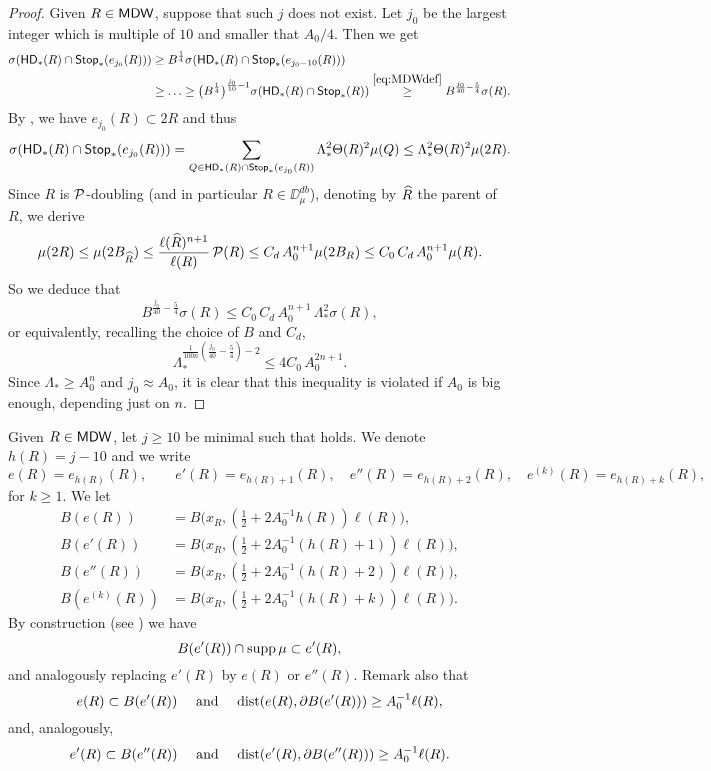 \begin{proof}
Given $R\in{\mathsf{MDW}}$, suppose that such $j$ does not exist. Let $j_0$ be the largest integer which is multiple of $10$ and smaller that $A_0/4$.
Then we get
\begin{align*}
\sigma({\mathsf{HD}}_*(R)\cap{\mathsf {Stop}}_*(e_{j_0}(R))) & \geq B^{\frac14}\sigma({\mathsf{HD}}_*(R)\cap{\mathsf {Stop}}_*(e_{j_0-10}(R)))\\
&\geq
\ldots \geq \big(B^{\frac14}\big)^{\frac{j_0}{10}-1}\sigma({\mathsf{HD}}_*(R)\cap{\mathsf {Stop}}_*(R)) \overset{\eqref{eq:MDWdef}}{\geq} B^{\frac{j_0}{40}-\frac54}\sigma(R).
\end{align*}
By , we have $e_{j_0}(R)\subset 2R$ and thus
$$\sigma({\mathsf{HD}}_*(R)\cap{\mathsf {Stop}}_*(e_{j_0}(R)))= \sum_{Q\in{\mathsf{HD}}_*(R)\cap {\mathsf {Stop}}_*(e_{j_0}(R))} \Lambda_*^2\Theta(R)^2\mu(Q)\leq 
\Lambda_*^2\Theta(R)^2\mu(2R).$$
Since $R$ is ${\mathcal P}$-doubling (and in particular $R\in\DD_\mu^{db}$), denoting by ${\widehat{R}}$ the parent of $R$,  we derive 
\begin{equation}\label{eqdoub*11}
\mu(2R)\leq \mu(2B_{{\widehat{R}}}) \leq \frac{\ell({\widehat{R}})^{n+1}}{\ell(R)}\,{\mathcal P}(R) \leq C_d\,A_0^{n+1}
\mu(2B_R)\leq C_0\,C_d\,A_0^{n+1}
\mu(R).
\end{equation}
So we deduce that
$$B^{\frac{j_0}{40}-\frac54}\sigma(R)\leq C_0\,C_d\,A_0^{n+1}\,\Lambda_*^2\sigma(R),$$
or equivalently, recalling the choice of $B$ and $C_d$,
$$\Lambda_*^{\frac{1}{100n}\left(\frac{j_0}{40}-\frac54\right) -2} \leq 4 C_0\,A_0^{2n+1}.$$
Since $\Lambda_*\geq A_0^n$ and $j_0\approx A_0$, it is clear that this inequality is violated if $A_0$ is big enough, depending just on $n$.
\end{proof}
\vv

Given $R\in{\mathsf{MDW}}$,  let $j\geq 10$ be minimal such that  holds. We denote
$h(R)=j-10$ and we write
$$e(R) = e_{h(R)}(R),\qquad e'(R) = e_{h(R)+1}(R), \quad e''(R)=e_{h(R)+2}(R), \quad e^{(k)}(R) = e_{h(R)+k}(R),$$
for $k\geq 1$. 
We let
\begin{align*}
B(e(R)) &= B\big(x_R,(\tfrac12 + 2A_0^{-1}h(R))\ell(R)\big),\\
B(e'(R)) & = B\big(x_R,(\tfrac12 + 2A_0^{-1}(h(R)+1))\ell(R)\big),\\
B(e''(R)) & = B\big(x_R,(\tfrac12 + 2A_0^{-1}(h(R)+2))\ell(R)\big),\\
B(e^{(k)}(R)) & = B\big(x_R,(\tfrac12 + 2A_0^{-1}(h(R)+k))\ell(R)\big).
\end{align*}
By construction (see ) we have 
$$B(e'(R))\cap\operatorname{supp}\mu\subset e'(R),$$
and analogously replacing $e'(R)$ by $e(R)$ or $e''(R)$.
Remark also that
$$e(R)\subset B(e'(R))\quad \text{ and }\quad {\rm dist}(e(R),\partial B(e'(R))) \geq A_0^{-1}\ell(R),$$
and, analogously,
$$e'(R)\subset B(e''(R))\quad \text{ and }\quad {\rm dist}(e'(R),\partial B(e''(R))) \geq A_0^{-1}\ell(R).$$



